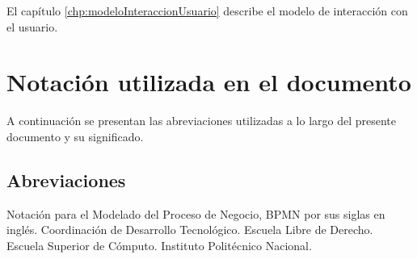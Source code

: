 \begin{Citemize}
	
	
	
	
	
	\item El capítulo \ref{chp:modeloInteraccionUsuario} describe el modelo de interacción con el usuario.
	

		
	
\end{Citemize}




\section{Notación utilizada en el documento}
\label{gls:Notacion utilizada en el documento}

A continuación se presentan las abreviaciones utilizadas a lo largo del presente documento y su significado.\\
\subsection{Abreviaciones}
	\begin{description}
	 Notación para el Modelado del Proceso de Negocio, BPMN por sus siglas en inglés.
	 Coordinación de Desarrollo Tecnológico.
	 Escuela Libre de Derecho.
	 Escuela Superior de Cómputo. 
	 Instituto Politécnico Nacional.

\end{description}


